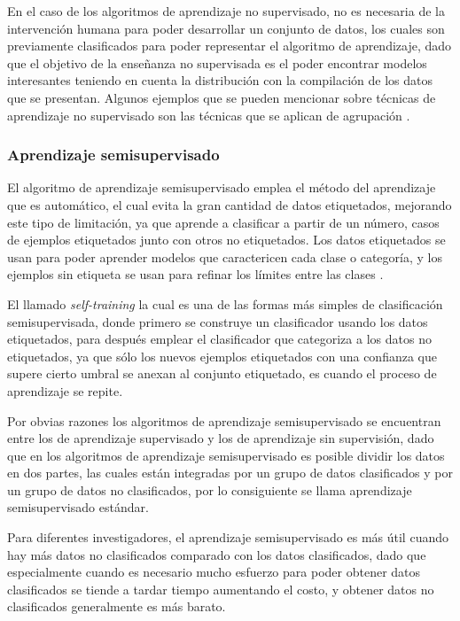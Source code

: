 En el caso de los algoritmos de aprendizaje no supervisado, no es necesaria de la intervención humana para poder desarrollar un conjunto de datos, los cuales son previamente clasificados para poder representar el algoritmo de aprendizaje, dado que el objetivo de la enseñanza no supervisada es el poder encontrar modelos interesantes teniendo en cuenta la distribución con la compilación de los datos que se presentan. Algunos ejemplos que se pueden mencionar sobre técnicas de aprendizaje no supervisado son las técnicas que se aplican de agrupación \cite{GonzalezPerez2020}.

\subsubsection{Aprendizaje semisupervisado}

El algoritmo de aprendizaje semisupervisado emplea el método del aprendizaje que es automático, el cual evita la gran cantidad de datos etiquetados, mejorando este tipo de limitación, ya que aprende a clasificar a partir de un número, casos de ejemplos etiquetados junto con otros no etiquetados. Los datos etiquetados se usan para poder aprender modelos que caractericen cada clase o categoría, y los ejemplos sin etiqueta se usan para refinar los límites entre las clases \cite{Cardoso2020Apr}.

El llamado \textit{self-training} la cual es una de las formas más simples de clasificación semisupervisada, donde primero se construye un clasificador usando los datos etiquetados, para después emplear el clasificador que categoriza a los datos no etiquetados, ya que sólo los nuevos ejemplos etiquetados con una confianza que supere cierto umbral se anexan al conjunto etiquetado, es cuando el proceso de aprendizaje se repite.

Por obvias razones los algoritmos de aprendizaje semisupervisado se encuentran entre los de aprendizaje supervisado y los de aprendizaje sin supervisión, dado que en los algoritmos de aprendizaje semisupervisado es posible dividir los datos en dos partes, las cuales están integradas por un grupo de datos clasificados y por un grupo de datos no clasificados, por lo consiguiente se llama aprendizaje semisupervisado estándar.

Para diferentes investigadores, el aprendizaje semisupervisado es más útil cuando hay más datos no clasificados comparado con los datos clasificados, dado que especialmente cuando es necesario mucho esfuerzo para poder obtener
datos clasificados se tiende a tardar tiempo aumentando el costo, y obtener datos no clasificados generalmente es más barato.

